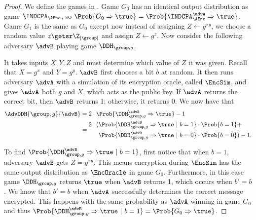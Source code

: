\begin{proof}
	We define the games in . Game $G_0$ has an identical output distribution as game $\INDCPA_{\AEnc}$, so $\Prob{G_0\Rightarrow\true} = \Prob{\INDCPA_{\AEnc}^\advA\Rightarrow\true}$. Game $G_1$ is the same as $G_0$ except now instead of assigning $Z \gets g^{xy}$, we choose a random value $z \getsr \Z_{|\group|}$ and assign $Z \gets g^z$. Now consider the following adversary $\advB$ playing game $\DDH_{\group, g}$. 
	
	\begin{center}
	\end{center}
	
	It takes inputs $X,Y,Z$ and must determine which value of $Z$ it was given. Recall that $X = g^x$ and $Y = g^y$. $\advB$ first chooses a bit $b$ at random. It then runs adversary $\advA$ with a simulation of its encryption oracle, called $\EncSim$, and gives $\advA$ both $g$ and $X$, which acts as the public key. If $\advA$ returns the correct bit, then $\advB$ returns 1; otherwise, it returns 0. We now have that
	\begin{align*}
		\AdvDDH{\group,g}{\advB} &= 2 \cdot \Prob{\DDH_{\group, g}^\advB\Rightarrow\true} - 1 \\
		&=
		\begin{aligned}
			2 \cdot (&\Prob{\DDH_{\group, g}^\advB\Rightarrow\true \ | \ b=1}\cdot\Prob{b=1} + \\
			&\Prob{\DDH_{\group, g}^\advB\Rightarrow\true \ | \ b=0}\cdot\Prob{b=0}) - 1 .
		\end{aligned}
	\end{align*} 
	
	To find $\Prob{\DDH_{\group, g}^\advB\Rightarrow\true \ | \ b=1}$, first notice that when $b=1$, adversary $\advB$ gets $Z = g^{xy}$. This means encryption during $\EncSim$ has the same output distribution as $\EncOracle$ in game $G_0$. Furthermore, in this case game $\DDH_{\group, g}$ returns $\true$ when $\advB$ returns 1, which occurs when $b'=b$. We know that $b'=b$ when $\advA$ successfully determines the correct message encrypted. This happens with the same probability as $\advA$ winning in game $G_0$ and thus $\Prob{\DDH_{\group, g}^\advB\Rightarrow\true \ | \ b=1} = \Prob{G_0 \Rightarrow\true}$. 
	

\end{proof}
